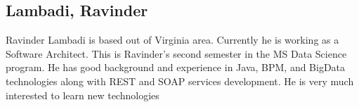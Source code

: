 
\subsection{Lambadi, Ravinder}

Ravinder Lambadi is based out of Virginia area. Currently he is working as a Software Architect. 
This is Ravinder's second semester in the MS Data Science program. He has good background and experience in Java, BPM, 
and BigData technologies along with REST and SOAP services development. He is very much interested to learn new technologies

